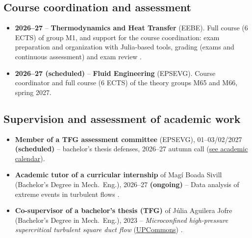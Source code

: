 \documentclass[11pt]{article}
\begin{document}
\subsection{Course coordination and assessment}
\begin{itemize}
  \item \textbf{2026--27} -- \textbf{Thermodynamics and Heat Transfer} (EEBE). Full course
  (6 ECTS) of group M1, and support for the course coordination: exam preparation and
  organization with Julia-based tools, grading (exams and continuous assessment) and exam
  review
  .
  \item \textbf{2026--27 (scheduled)} -- \textbf{Fluid Engineering} (EPSEVG). Course
  coordinator and full course (6 ECTS) of the theory groups M65 and M66, spring 2027.
\end{itemize}

\subsection{Supervision and assessment of academic work}
\begin{itemize}
  \item \textbf{Member of a TFG assessment committee} (EPSEVG), 01--03/02/2027
  \textbf{(scheduled)} -- bachelor's thesis defenses, 2026--27 autumn call
  (\href{https://drive.google.com/file/d/1TGufsft81vD3qv27ZWpKPmW_KSVtG-hR/view}{see academic calendar}).
  \item \textbf{Academic tutor of a curricular internship} of Mag\'i Boada Sivill
  (Bachelor's Degree in Mech.\ Eng.), 2026--27 \textbf{(ongoing)} -- Data analysis of
  extreme events in turbulent flows .
  \item \textbf{Co-supervisor of a bachelor's thesis (TFG)} of J\'ulia Aguilera Jofre
  (Bachelor's Degree in Mech.\ Eng.), 2023 -- \emph{Microconfined high-pressure
  supercritical turbulent square duct flow}
  (\href{https://hdl.handle.net/2117/395741}{UPCommons})
  .
\end{itemize}
\end{document}
